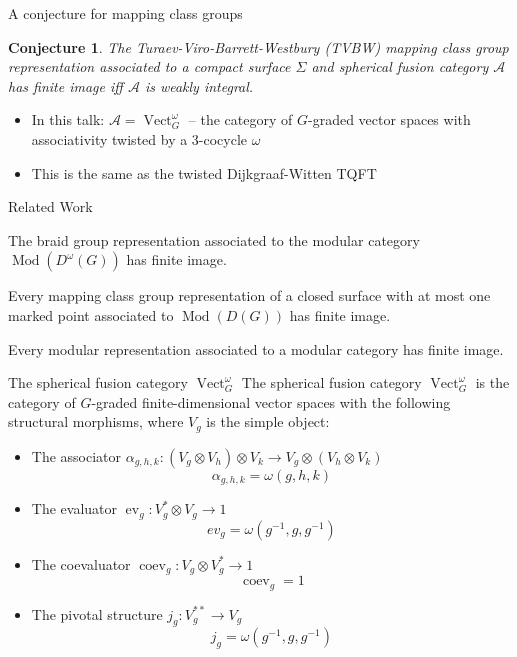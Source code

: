 \documentclass{beamer}
\DeclareMathOperator{\ev}{ev}
\DeclareMathOperator{\coev}{coev}
\DeclareMathOperator{\Vect}{Vect}
\DeclareMathOperator{\Mod}{Mod}
\newtheorem{conj}[theorem]{Conjecture}
\begin{document}
\begin{frame}{A conjecture for mapping class groups}
\begin{conj}
The Turaev-Viro-Barrett-Westbury (TVBW) mapping class group representation associated to a compact surface $\Sigma$ and spherical fusion category $\mathcal A$ has finite image iff $\mathcal A$ is weakly integral.
\end{conj}

\vspace{0.2in}

\begin{itemize}
\pause
\item In this talk: $\mathcal A = \Vect_G^\omega$ -- the category of $G$-graded vector spaces with associativity twisted by a 3-cocycle $\omega$ 
\item This is the same as the twisted Dijkgraaf-Witten TQFT
\end{itemize}

\end{frame}


\begin{frame}{Related Work}
\begin{theorem}
The braid group representation associated to 
the modular category $\Mod(D^\omega(G))$ has finite image.
\end{theorem}

\begin{theorem}
Every mapping class group representation of a closed surface with at most one marked point associated to $\Mod(D(G))$ has finite image.
\end{theorem}

\begin{theorem}[Ng--Schauenberg]
Every modular representation associated to a modular category has finite image.
\end{theorem}
\end{frame}


\begin{frame}{The spherical fusion category $\Vect^\omega_G$}
  The spherical fusion category $\Vect^\omega_G$ is the category of $G$-graded finite-dimensional vector spaces with the following structural morphisms, where $V_g$ is the simple object:   
\begin{itemize} 
\item The associator $\alpha_{g,h,k}:(V_g \otimes V_h) \otimes V_k \to V_g \otimes (V_h \otimes V_k)$
            $$ \alpha_{g,h,k} = \omega(g,h,k)$$
\item The evaluator $\ev_g:V_g^* \otimes V_g \to 1$
  $$ ev_g = \omega(g^{-1},g,g^{-1})$$
\item The coevaluator $\coev_g:V_g \otimes V_g^* \to 1$
    $$\coev_g = 1$$
\item The pivotal structure $j_g:V_g^{**} \to V_g$
            $$ j_g = \omega(g^{-1},g,g^{-1})$$
\end{itemize}

\end{frame}
\end{document}
